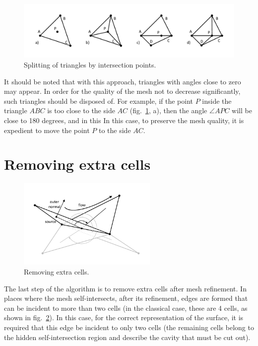 \documentclass[
11pt,%
tightenlines,%
twoside,%
onecolumn,%
nofloats,%
nobibnotes,%
nofootinbib,%
superscriptaddress,%
noshowpacs,%
centertags]%
{revtex4}
\begin{document}
\begin{figure}[h]
\includegraphics[width=1.0\textwidth]{pics/pic_split_s.pdf}
\caption{Splitting of triangles by intersection points.}\label{fig:pic_split_s}
\end{figure}

It should be noted that with this approach, triangles with angles close to zero may appear.
In order for the quality of the mesh not to decrease significantly, such triangles should be disposed of.
For example, if the point $P$ inside the triangle $ABC$ is too close to the side $AC$ (fig.~\ref{fig:pic_split_s}, a), then the angle $\angle APC$ will be close to 180 degrees, and in this In this case, to preserve the mesh quality, it is expedient to move the point $P$ to the side $AC$.

\section{Removing extra cells}

\begin{figure}[h]
\includegraphics[width=0.6\textwidth]{pics/pic_del_extra_s.pdf}
\caption{Removing extra cells.}\label{fig:pic_del_extra_s}
\end{figure}

The last step of the algorithm is to remove extra cells after mesh refinement.
In places where the mesh self-intersects, after its refinement, edges are formed that can be incident to more than two cells (in the classical case, these are 4 cells, as shown in fig.~\ref{fig:pic_del_extra_s}).
In this case, for the correct representation of the surface, it is required that this edge be incident to only two cells (the remaining cells belong to the hidden self-intersection region and describe the cavity that must be cut out).
\end{document}
